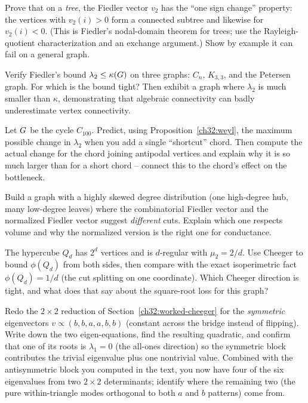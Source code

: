 \begin{exercise}
Prove that on a \emph{tree}, the Fiedler vector $v_2$ has the ``one sign change'' property: the vertices with $v_2(i)>0$ form a connected subtree and likewise for $v_2(i)<0$. (This is Fiedler's nodal-domain theorem for trees; use the Rayleigh-quotient characterization and an exchange argument.) Show by example it can fail on a general graph.
\end{exercise}

\begin{exercise}
Verify Fiedler's bound $\lambda_2\le\kappa(G)$ on three graphs: $C_n$, $K_{3,3}$, and the Petersen graph. For which is the bound tight? Then exhibit a graph where $\lambda_2$ is much smaller than $\kappa$, demonstrating that algebraic connectivity can badly underestimate vertex connectivity.
\end{exercise}

\begin{exercise}
Let $G$ be the cycle $C_{100}$. Predict, using Proposition~\ref{ch32:weyl}, the maximum possible change in $\lambda_2$ when you add a single ``shortcut'' chord. Then compute the actual change for the chord joining antipodal vertices and explain why it is so much larger than for a short chord -- connect this to the chord's effect on the bottleneck.
\end{exercise}

\begin{exercise}
Build a graph with a highly skewed degree distribution (one high-degree hub, many low-degree leaves) where the combinatorial Fiedler vector and the normalized Fiedler vector suggest \emph{different} cuts. Explain which one respects volume and why the normalized version is the right one for conductance.
\end{exercise}

\begin{exercise}
The hypercube $Q_d$ has $2^d$ vertices and is $d$-regular with $\mu_2=2/d$. Use Cheeger to bound $\phi(Q_d)$ from both sides, then compare with the exact isoperimetric fact $\phi(Q_d)=1/d$ (the cut splitting on one coordinate). Which Cheeger direction is tight, and what does that say about the square-root loss for this graph?
\end{exercise}

\begin{exercise}
Redo the $2\times2$ reduction of Section~\ref{ch32:worked-cheeger} for the \emph{symmetric} eigenvectors $v\propto(b,b,a,a,b,b)$ (constant across the bridge instead of flipping). Write down the two eigen-equations, find the resulting quadratic, and confirm that one of its roots is $\lambda_1=0$ (the all-ones direction) so the symmetric block contributes the trivial eigenvalue plus one nontrivial value. Combined with the antisymmetric block you computed in the text, you now have four of the six eigenvalues from two $2\times2$ determinants; identify where the remaining two (the pure within-triangle modes orthogonal to both $a$ and $b$ patterns) come from.
\end{exercise}

